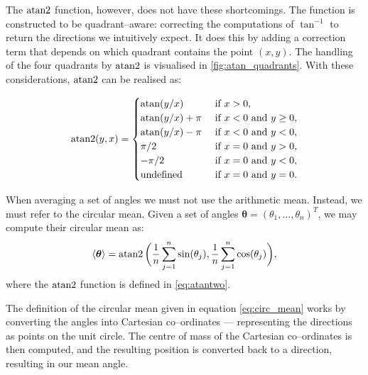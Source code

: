 The $\operatorname{atan2}$ function, however, does not have these shortcomings. The function is constructed to be quadrant--aware: correcting the computations of $\tan^{-1}$ to return the directions we intuitively expect. It does this by adding a correction term that depends on which quadrant contains the point $(x, y)$. The handling of the four quadrants by $\operatorname{atan2}$ is visualised in \cref{fig:atan_quadrants}. With these considerations, $\operatorname{atan2}$ can be realised as:

\begin{equation}
\label{eq:atantwo}
	\atantwo(y, x) = 
	\begin{cases}
		\atan(y/x) & \text{ if } x > 0, \\
		\atan(y/x) + \pi & \text{ if } x < 0 \text{ and } y \geq 0, \\
		\atan(y/x) - \pi & \text{ if } x < 0 \text{ and } y < 0, \\
		\pi/2  & \text{ if } x = 0 \text{ and } y > 0, \\
		- \pi/2 & \text{ if } x = 0 \text{ and } y < 0, \\
		\text{undefined} & \text{ if } x = 0 \text{ and } y = 0. \\
	\end{cases}
\end{equation}

When averaging a set of angles we must not use the arithmetic mean. Instead, we must refer to the circular mean. Given a set of angles $\bm{\theta} = (\theta_1, \ldots, \theta_n)^T$, we may compute their circular mean as:
\begin{equation}
	\label{eq:circ_mean}
	\langle \bm{\theta} \rangle = \operatorname{atan2}\bigg(\frac{1}{n} \sum_{j=1}^n \sin(\theta_j), \frac{1}{n} \sum_{j=1}^n \cos(\theta_j)\bigg),
\end{equation}
where the $\operatorname{atan2}$ function is defined in \cref{eq:atantwo}.

The definition of the circular mean given in equation \cref{eq:circ_mean} works by converting the angles into Cartesian co--ordinates --- representing the directions as points on the unit circle. The centre of mass of the Cartesian co--ordinates is then computed, and the resulting position is converted back to a direction, resulting in our mean angle.
